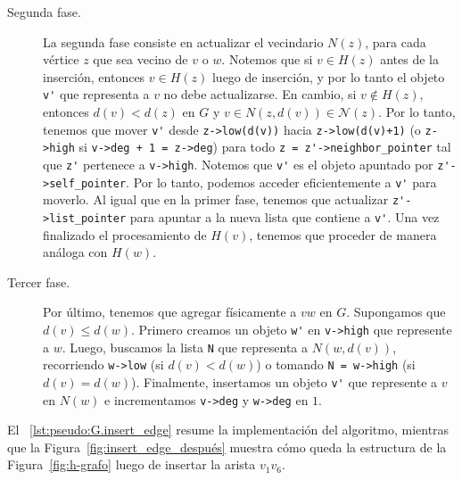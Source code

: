 \documentclass[%
    a4paper,%
    fontsize=12pt,%
    DIV=12,
    twoside,%
    openright,%
    titlepage=true,%
    headsepline,%
    toc=bibliography,%
    parskip=half,%
    cleardoublepage=empty,%
    headings=big,%
]{scrbook}
\makeatletter
\newcommand{\Code}[2][]{\lstinline[basicstyle={\ttfamily},#1]@#2@}
\newcommand{\N}{\mathcal{N}}
\makeatother
\begin{document}
\begin{description}
\item [Segunda fase.]  La segunda fase consiste en actualizar el vecindario $N(z)$, para cada vértice $z$ que sea vecino de $v$ o $w$.  Notemos que si $v \in H(z)$ antes de la inserción, entonces $v \in H(z)$ luego de inserción, y por lo tanto el objeto \Code{v'} que representa a $v$ no debe actualizarse.  En cambio, si $v \not\in H(z)$, entonces $d(v) < d(z)$ en $G$ y $v \in N(z, d(v)) \in \N(z)$.  Por lo tanto, tenemos que mover \Code{v'} desde \Code{z->low(d(v))} hacia \Code{z->low(d(v)+1)} (o \Code{z->high} si \Code{v->deg + 1 = z->deg}) para todo \Code{z = z'->neighbor_pointer} tal que \Code{z'} pertenece a \Code{v->high}.  Notemos que \Code{v'} es el objeto apuntado por \Code{z'->self_pointer}.  Por lo tanto, podemos acceder eficientemente a \Code{v'} para moverlo.  Al igual que en la primer fase, tenemos que actualizar \Code{z'->list_pointer} para apuntar a la nueva lista que contiene a \Code{v'}.  Una vez finalizado el procesamiento de $H(v)$, tenemos que proceder de manera análoga con $H(w)$.
%
\item [Tercer fase.] Por último, tenemos que agregar físicamente a $vw$ en $G$.  Supongamos que $d(v) \leq d(w)$.  Primero creamos un objeto \Code{w'} en \Code{v->high} que represente a $w$.  Luego, buscamos la lista \Code{N} que representa a $N(w, d(v))$, recorriendo \Code{w->low} (si $d(v) < d(w)$) o tomando \Code{N = w->high} (si $d(v) = d(w)$).  Finalmente, insertamos un objeto \Code{v'} que represente a $v$ en $N(w)$ e  incrementamos \Code{v->deg} y \Code{w->deg} en $1$.  
\end{description}
El \lstlistingname~\ref{lst:pseudo:G.insert_edge} resume la implementación del algoritmo, mientras que la Figura~\ref{fig:insert_edge_después} muestra cómo queda la estructura de la Figura~\ref{fig:h-grafo} luego de insertar la arista $v_1v_6$. 
\end{document}
